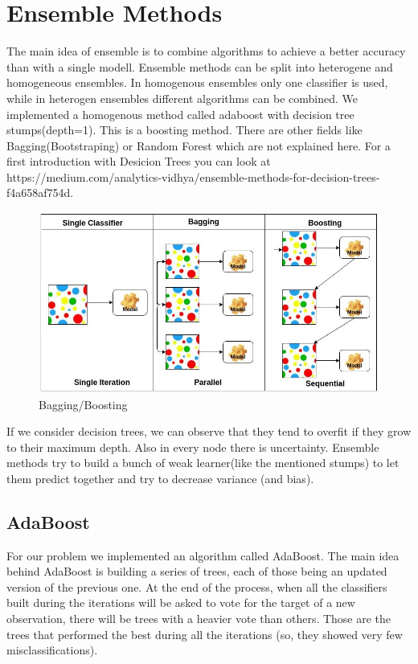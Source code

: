 \section{Ensemble Methods}
The main idea of ensemble is to combine algorithms to achieve a better accuracy than with a single modell. Ensemble methods can be split into heterogene and homogeneous ensembles. In homogenous ensembles only one classifier is used, while in heterogen ensembles different algorithms can be combined. 
We implemented a homogenous method called adaboost with decision tree stumps(depth=1). This is a boosting method. There are other fields like Bagging(Bootstraping) or Random Forest which are not explained here. For a first introduction with Desicion Trees you can look at https://medium.com/analytics-vidhya/ensemble-methods-for-decision-trees-f4a658af754d.\\
\begin{figure}[hbtp]
	\centering
	\includegraphics[scale=0.5]{ensemble_1}
	\caption{Bagging/Boosting}
	\label{fig:Datensatz - unbearbeitet}
\end{figure}
If we consider decision trees, we can observe that they tend to overfit if they grow to their maximum depth. Also in every node there is uncertainty. Ensemble methods try to build a bunch of weak learner(like the mentioned stumps) to let them predict together and try to decrease variance (and bias).



\subsection{AdaBoost}
For our problem we implemented an algorithm called AdaBoost. The main idea behind AdaBoost is building a series of trees, each of those being an updated version of the previous one. At the end of the process, when all the classifiers built during the iterations will be asked to vote for the target of a new observation, there will be trees with a heavier vote than others. Those are the trees that performed the best during all the iterations (so, they showed very few misclassifications).

